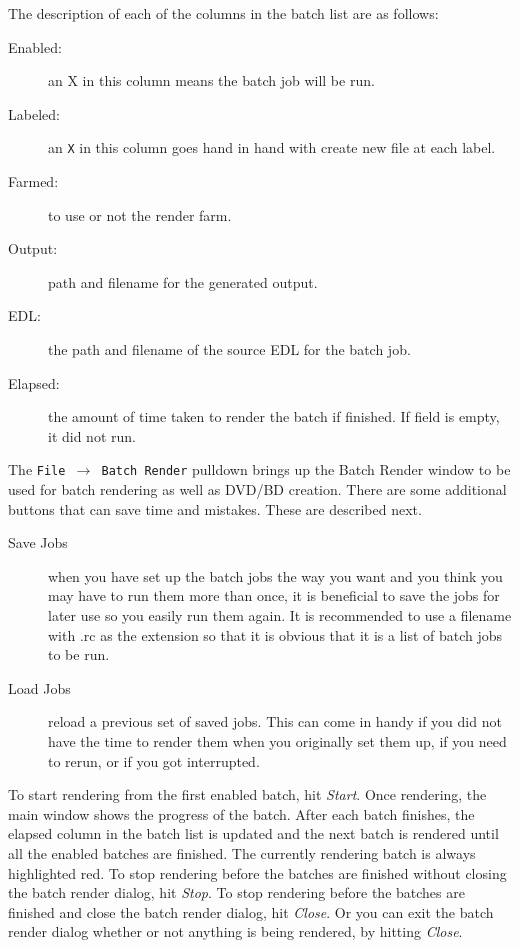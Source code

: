 The description of each of the columns in the batch list are as
follows:

\begin{description}
\item[Enabled:] an X in this column means the batch job will be run.
\item[Labeled:] an \texttt{X} in this column goes hand in hand with
  create new file at each label.
\item[Farmed:] to use or not the render farm.
\item[Output:] path and filename for the generated output.
\item[EDL:] the path and filename of the source EDL for the batch
  job.
\item[Elapsed:] the amount of time taken to render the batch if
  finished.  If field is empty, it did not run.
\end{description} 

The \texttt{File $\rightarrow$ Batch Render} pulldown brings up the
Batch Render window to be used for batch rendering as well as DVD/BD
creation.  There are some additional buttons that can save time and
mistakes.  These are described next.

\begin{description}
	\item[Save Jobs] when you have set up the batch jobs the way you
	want and you think you may have to run them more than once, it is
	beneficial to save the jobs for later use so you easily run them
	again.  It is recommended to use a filename with .rc as the extension
	so that it is obvious that it is a list of batch jobs to be run.
	\item[Load Jobs] reload a previous set of saved jobs.  This can come
	in handy if you did not have the time to render them when you
	originally set them up, if you need to rerun, or if you got
	interrupted.
\end{description}

To start rendering from the first enabled batch,
hit \textit{Start}.  Once rendering, the main window shows the
progress of the batch. After each batch finishes, the elapsed column
in the batch list is updated and the next batch is rendered until
all the enabled batches are finished.  The currently rendering batch
is always highlighted red.  To stop rendering before the batches are
finished without closing the batch render dialog, hit \textit{Stop}.
To stop rendering before the batches are finished and close the
batch render dialog, hit \textit{Close}.  Or you can exit the batch
render dialog whether or not anything is being rendered, by hitting
\textit{Close}.

